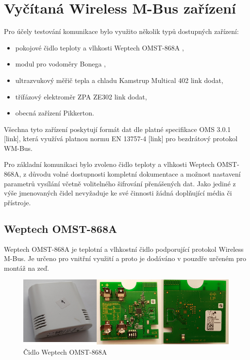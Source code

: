 \chapter{Vyčítaná Wireless M-Bus zařízení}

Pro účely testování komunikace bylo využito několik typů dostupných zařízení:
\begin{itemize}
	\item pokojové čidlo teploty a vlhkosti Weptech OMST-868A \cite{WeptechCidlo},
	\item modul pro vodoměry Bonega \cite{BonegaCidlo},
	\item ultrazvukový měřič tepla a chladu Kamstrup Multical 402 \colorbox[rgb]{0,1,0}{link dodat},
	\item třífázový elektroměr ZPA ZE302 \colorbox[rgb]{0,1,0}{link dodat},
	\item obecná zařízení Pikkerton.
\end{itemize}

Všechna tyto zařízení poskytují formát dat dle platné specifikace OMS 3.0.1 \colorbox[rgb]{0,1,0}{[link]}, která využívá platnou normu EN 13757-4 \colorbox[rgb]{0,1,0}{[link]} pro bezdrátový protokol WM-Bus.

Pro základní komunikaci bylo zvoleno čidlo teploty a vlhkosti Weptech OMST-868A, z důvodu volné dostupnosti kompletní dokumentace a možnost nastavení parametrů vysílání včetně volitelného šifrování přenášených dat. Jako jediné z výše jmenovaných čidel nevyžaduje ke své činnosti žádná doplňující média či přístroje.
	
	
	
	\section{Weptech OMST-868A}
	
	Weptech OMST-868A je teplotní a vlhkostní čidlo podporující protokol Wireless M-Bus. Je určeno pro vnitřní využití a proto je dodáváno v pouzdře určeném pro montáž na zeď.
	
	 \begin{figure}[!h]
  \begin{center}
    \includegraphics[scale=0.70]{obrazky/weptech_fotky}
  \end{center}
  \caption{Čidlo Weptech OMST-868A \cite{WeptechCidlo}}
\end{figure}


